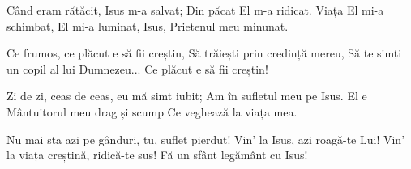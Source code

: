 \beginverse
Când eram rătăcit, Isus m-a salvat;
Din păcat El m-a ridicat.
Viața El mi-a schimbat, El mi-a luminat,
Isus, Prietenul meu minunat.
\endverse

\beginchorus
Ce frumos, ce plăcut e să fii creștin,
Să trăiești prin credință mereu,
Să te simți un copil al lui Dumnezeu...
Ce plăcut e să fii creștin!
\endchorus

\beginverse
Zi de zi, ceas de ceas, eu mă simt iubit;
Am în sufletul meu pe Isus.
El e Mântuitorul meu drag și scump
Ce veghează la viața mea.
\endverse

\beginverse
Nu mai sta azi pe gânduri, tu, suflet pierdut!
Vin' la Isus, azi roagă-te Lui!
Vin' la viața creștină, ridică-te sus!
Fă un sfânt legământ cu Isus!
\endverse
\endsong